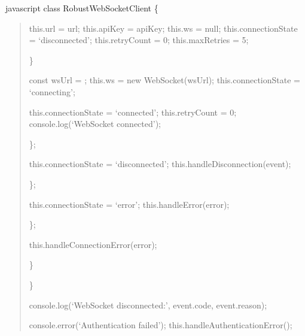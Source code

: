 \documentclass[letterpaper,10pt,english]{sphinxmanual}
\begin{document}
\sphinxAtStartPar
{\color{red}\bfseries{}\textasciigrave{}\textasciigrave{}}{\color{red}\bfseries{}\textasciigrave{}}javascript
class RobustWebSocketClient \{
\begin{quote}
\begin{description}
\sphinxAtStartPar
this.url = url;
this.apiKey = apiKey;
this.ws = null;
this.connectionState = ‘disconnected’;
this.retryCount = 0;
this.maxRetries = 5;

\end{description}

\sphinxAtStartPar
\}
\begin{description}
\begin{description}
\sphinxAtStartPar
const wsUrl = ;
this.ws = new WebSocket(wsUrl);
this.connectionState = ‘connecting’;
\begin{description}
\sphinxAtStartPar
this.connectionState = ‘connected’;
this.retryCount = 0;
console.log(‘WebSocket connected’);

\end{description}

\sphinxAtStartPar
\};
\begin{description}
\sphinxAtStartPar
this.connectionState = ‘disconnected’;
this.handleDisconnection(event);

\end{description}

\sphinxAtStartPar
\};
\begin{description}
\sphinxAtStartPar
this.connectionState = ‘error’;
this.handleError(error);

\end{description}

\sphinxAtStartPar
\};

\sphinxAtStartPar
this.handleConnectionError(error);

\end{description}

\sphinxAtStartPar
\}

\end{description}

\sphinxAtStartPar
\}
\begin{description}
\sphinxAtStartPar
console.log(‘WebSocket disconnected:’, event.code, event.reason);
\begin{description}
\sphinxAtStartPar
console.error(‘Authentication failed’);
this.handleAuthenticationError();


\end{description}
\end{description}
\end{quote}
\end{document}
